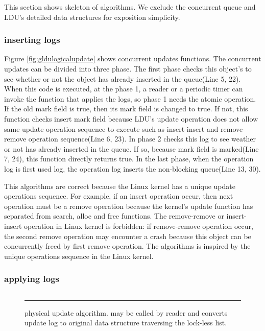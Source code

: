This section shows skeleton of algorithms.
We exclude the concurrent queue and LDU's detailed data structures for
exposition simplicity.


\subsubsection{inserting logs}
Figure \ref{fig:gldulogicalupdate} shows concurrent updates functions.
The concurrent updates can be divided into three phase.
The first phase checks this object's to see whether or not the
object has already inserted in the queue(Line 5, 22).
When this code is executed, at the phase 1, a reader or a periodic timer can
invoke the  function that applies the logs, so
phase 1 needs the atomic operation.
If the old mark field is true, then its mark field is changed to true.
If not, this function checks insert mark field because LDU's update operation
does not allow same update operation sequence to execute such as insert-insert
and remove-remove operation sequence(Line 6, 23).
In phase 2 checks this log to see weather or not has already inserted in
the queue.
If so, because mark field is marked(Line 7, 24), this function directly returns
true.
In the last phase, when the operation log is first used log, the
operation log inserts the non-blocking queue(Line 13, 30).

This algorithms are correct because the Linux kernel has a unique update
operations sequence.
For example, if an insert operation occur, then next operation must be a remove
operation because the kernel's update function has separated from search, alloc
and free functions.
The remove-remove or insert-insert operation in Linux kernel is
forbidden: if remove-remove operation occur, the second remove operation may
encounter a crash because this object can be concurrently freed by first remove
operation.
The algorithms is inspired by the unique operations sequence in the
Linux kernel.

\subsubsection{applying logs}
\begin{figure}[tb]
\begin{center}
\inputminted[linenos,fontsize=\footnotesize, tabsize=2]{c}{src/ldu_physical.c}
\end{center}
\rule{\columnwidth}{0.5pt}
\vspace{-\baselineskip}
\caption{ physical update algorithm.  may be
 called by reader and converts update log to original data structure
 traversing the lock-less list.}
\label{fig:glduphysicalupdate}
\end{figure}


